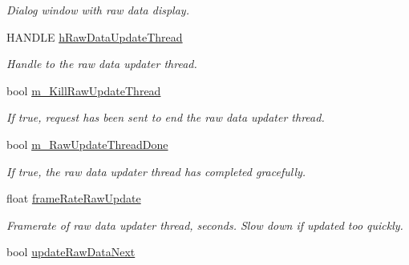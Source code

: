 \begin{DoxyCompactItemize}
\begin{DoxyCompactList}\small\item\em Dialog window with raw data display. \end{DoxyCompactList}\item 
\hypertarget{class_three_d_viewer_ad44192b1c9817758328b7a3705b47e13}{
HANDLE \hyperlink{class_three_d_viewer_ad44192b1c9817758328b7a3705b47e13}{hRawDataUpdateThread}}
\label{class_three_d_viewer_ad44192b1c9817758328b7a3705b47e13}

\begin{DoxyCompactList}\small\item\em Handle to the raw data updater thread. \end{DoxyCompactList}\item 
\hypertarget{class_three_d_viewer_ab5706913085db6c9599ed27e92eb6f3b}{
bool \hyperlink{class_three_d_viewer_ab5706913085db6c9599ed27e92eb6f3b}{m\_\-KillRawUpdateThread}}
\label{class_three_d_viewer_ab5706913085db6c9599ed27e92eb6f3b}

\begin{DoxyCompactList}\small\item\em If true, request has been sent to end the raw data updater thread. \end{DoxyCompactList}\item 
\hypertarget{class_three_d_viewer_ab62c47b1003a7e4ca1a624e52e079655}{
bool \hyperlink{class_three_d_viewer_ab62c47b1003a7e4ca1a624e52e079655}{m\_\-RawUpdateThreadDone}}
\label{class_three_d_viewer_ab62c47b1003a7e4ca1a624e52e079655}

\begin{DoxyCompactList}\small\item\em If true, the raw data updater thread has completed gracefully. \end{DoxyCompactList}\item 
\hypertarget{class_three_d_viewer_a494bee4b1da357ce55763a4682d65a14}{
float \hyperlink{class_three_d_viewer_a494bee4b1da357ce55763a4682d65a14}{frameRateRawUpdate}}
\label{class_three_d_viewer_a494bee4b1da357ce55763a4682d65a14}

\begin{DoxyCompactList}\small\item\em Framerate of raw data updater thread, seconds. Slow down if updated too quickly. \end{DoxyCompactList}\item 
\hypertarget{class_three_d_viewer_a29bf7d225801957f1430d94fef9f9582}{
bool \hyperlink{class_three_d_viewer_a29bf7d225801957f1430d94fef9f9582}{updateRawDataNext}}
\label{class_three_d_viewer_a29bf7d225801957f1430d94fef9f9582}


\end{DoxyCompactItemize}
